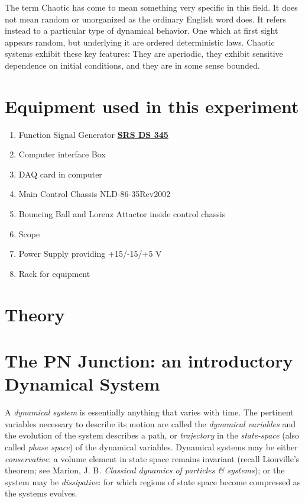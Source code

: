 \documentclass{../lab}
\begin{document}
The term Chaotic has come to mean something very specific in this field. It does not mean random or unorganized as the ordinary English word does. It refers instead to a particular type of dynamical behavior. One which at first sight appears random, but underlying it are ordered deterministic laws. Chaotic systems exhibit these key features: They are aperiodic, they exhibit sensitive dependence on initial conditions, and they are in some sense bounded.

\section{Equipment used in this experiment}

\begin{enumerate}
    \item Function Signal Generator \href{https://youtu.be/PrM8DHFOFS0}{\textbf{SRS DS 345}}

    \item Computer interface Box

    \item DAQ card in computer

    \item Main Control Chassis NLD-86-35Rev2002

    \item Bouncing Ball and Lorenz Attactor inside control chassis

    \item Scope

    \item Power Supply providing +15/-15/+5 V

    \item Rack for equipment

\end{enumerate}

\section{Theory}

\section{The PN Junction: an introductory Dynamical System}

A \emph{dynamical system} is essentially anything that varies with time. The pertinent variables necessary to describe its motion are called the \emph{dynamical variables} and the evolution of the system describes a path, or \emph{trajectory} in the \emph{state-space} (also called \emph{phase space}) of the dynamical variables. Dynamical systems may be either \emph{conservative}: a volume element in state space remains invariant (recall Liouville's theorem; see Marion, J. B\emph{. Classical dynamics of particles \& systems}); or the system may be \emph{dissipative}: for which regions of state space become compressed as the systems evolves.
\end{document}
